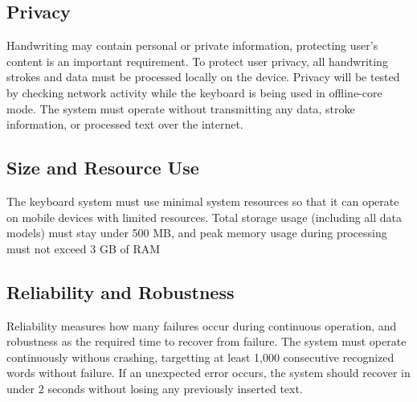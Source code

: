\documentclass[12pt,a4paper]{report}
\begin{document}
\subsection{Privacy}
Handwriting may contain personal or private information, protecting user's content is an important requirement. To protect user privacy, all handwriting strokes and data must be processed locally on the device. Privacy will be tested by checking network activity while the keyboard is being used in offline-core mode. The system must operate without transmitting any data, stroke information, or processed text over the internet.

\subsection{Size and Resource Use}
The keyboard system must use minimal system resources so that it can operate on mobile devices with limited resources. Total storage usage (including all data models) must stay under 500 MB, and peak memory usage during processing must not exceed 3 GB of RAM

\subsection{Reliability and Robustness}
Reliability measures how many failures occur during continuous operation, and robustness as the required time to recover from failure. The system must operate continuously withous crashing, targetting at least 1,000 consecutive recognized words without failure. If an unexpected error occurs, the system should recover in under 2 seconds without losing any previously inserted text.
\end{document}
